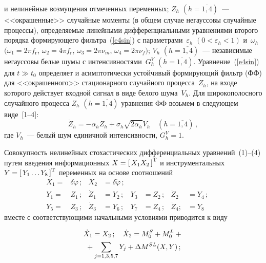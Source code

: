 \begin{multicols}{2}
и нелинейные возмущения отмеченных переменных;
 $Z_h$ $(h=\overline{1,4})$~---  <<окрашенные>>
 случайные моменты (в общем случае негауссовы случайные процессы), определяемые
линейными дифференциальными уравнениями второго порядка
формирующего фильтра~(\ref{e4sin}) с параметрами~$\varepsilon_h$ $(0<\varepsilon_h <1)$ 
и~$\omega_h$ $(\omega_1 = 2\pi f_{\mathrm{г}}$, $\omega_2 = 4\pi f_{\mathrm{г}}$,
$\omega_3 = 2\pi \nu_m$, $\omega_4 = 2\pi \nu_f)$;
$V_h$ $(h=\overline{1,4})$~--- независимые негауссовы белые шумы с интенсивностями~$G_h^V$ $(h=\overline{1,4})$.
Уравнение~(\ref{e4sin}) для $t\gg t_0$ определяет и асимптотически устойчивый
формирующий фильтр (ФФ) для <<окрашенного>> стационарного случайного процесса~$Z_h$, 
на входе которого действует входной сигнал в виде белого шума~$V_h$.
Для широкополосного случайного процесса $Z_h$ $(h=\overline{1,4})$ уравнения ФФ возьмем в следующем виде~[1--4]:
\begin{equation}
\dot Z_h =-\alpha_h Z_h +\sigma_h \sqrt{2\alpha_h} V_h\quad (h=\overline{1,4})\,,
\label{e5sin}
\end{equation}
где $V_h$~--- белый шум единичной интенсивности, $G_h^V =1$.

Совокупность нелинейных стохастических дифференциальных уравнений~(1)--(4) 
путем введения информационных  $X=\left[\, X_1 X_2\,\right]^{\mathrm{T}}$ и инструментальных
 $Y=\left[\, Y_1\ldots Y_8\,\right]^{\mathrm{T}}$ переменных на основе соотношений
\begin{align*}
   X_1 =&\delta \varphi\,;&X_2& =\delta \dot \varphi\,;& &&&&&\\
   Y_1 =& Z_1\,;&\dot Z_1& = Y_2\,;& Y_3& = Z_2\,;& \dot Z_2 &= Y_4\,;\\
   Y_5 =& Z_3\,; & \dot Z_3 &= Y_6\,;& Y_7&= Z_4\,;& \dot Z_4; &= Y_{8}
\end{align*}
вместе с соответствующими начальными условиями приводится к виду

\noindent
    \begin{multline}
    \dot X_1 = X_2\,;\quad \dot X_2 = M_0^{S}+M_0^L +{}\\
    {}+ \sum\limits_{j=1,3,5,7} Y_j + \Delta M^{SL} (X,Y)\,;
    \label{e7sin}
    \end{multline}

    \vspace*{-12pt}
    

\end{multicols}
